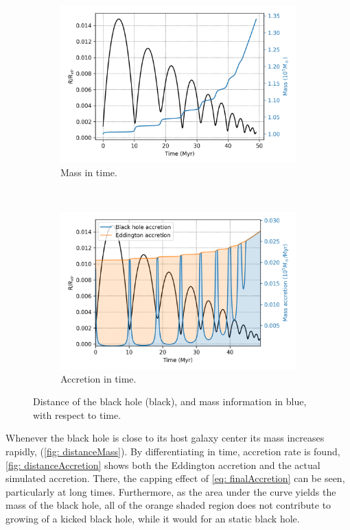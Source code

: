 	\begin{figure}[h]
		\centering
		\begin{subfigure}[b]{0.49\textwidth}
			\includegraphics[width = \textwidth]{"../Files/Week 14/mass_behavior"}
			\caption{Mass in time.}
			\label{fig: distanceMass}
		\end{subfigure}
		~ 
		\begin{subfigure}[b]{0.49\textwidth}
			\includegraphics[width=\textwidth]{"../Files/Week 14/mass_accretion"}
			\caption{Accretion in time.}
			\label{fig: distanceAccretion}
		\end{subfigure}
		\caption{Distance of the black hole (black), and mass information in blue, with respect to time.}
		\label{fig: accretionEff}
	\end{figure}
	
	Whenever the black hole is close to its host galaxy center its mass increases rapidly, (\autoref{fig: distanceMass}). By differentiating in time, accretion rate is found, \autoref{fig: distanceAccretion} shows both the Eddington accretion and the actual simulated accretion. There, the capping effect of \autoref{eq: finalAccretion} can be seen, particularly at long times. Furthermore, as the area under the curve yields the mass of the black hole, all of the orange shaded region does not contribute to growing of a kicked black hole, while it would for an static black hole.
	
